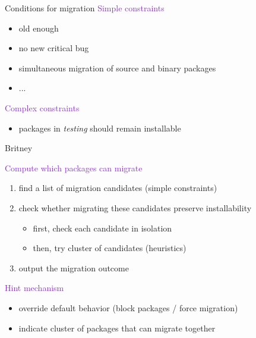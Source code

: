 \documentclass[xcolor={dvipsnames}]{beamer}
\newcommand{\EEE}[1]{\textcolor{BlueViolet}{#1}}
\begin{document}
\begin{frame}{Conditions for migration}
\EEE{Simple constraints} %
\begin{itemize}
\item old enough
\item no new critical bug
\item simultaneous migration of source and binary packages
\item ...
\end{itemize}

\vspace{1em}

\EEE{Complex constraints}
\begin{itemize}
\item packages in \textit{testing} should remain installable
\end{itemize}
\end{frame}

\begin{frame}{Britney}

\EEE{Compute which packages can migrate}
\begin{enumerate}
\item find a list of migration candidates (simple constraints)
\item check whether migrating these candidates preserve installability
\begin{itemize}
\item first, check each candidate in isolation
\item then, try cluster of candidates (heuristics)
\end{itemize}
\item output the migration outcome
\end{enumerate}

\vspace{1cm}

\EEE{Hint mechanism}
\begin{itemize}
\item override default behavior (block packages / force migration)
\item indicate cluster of packages that can migrate together
\end{itemize}
\end{frame}
\end{document}
